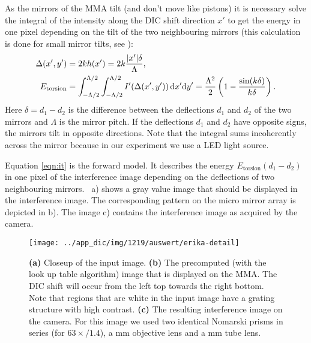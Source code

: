 As the mirrors of the MMA tilt (and don't move like pistons) it is
necessary solve the integral of the intensity along the DIC shift
direction $x'$ to get the energy in one pixel depending on the tilt of
the two neighbouring mirrors (this calculation is done for small
mirror tilts, see ):
\begin{align}
\label{eqn:it}
\Delta(x',y') &= 2kh(x') = 2k\frac{\mathopen| x' \mathclose| \delta}{\Lambda},\\
E_\textrm{torsion}&=\int_{-\Lambda/2}^{\Lambda/2}\int_{-\Lambda/2}^{\Lambda/2}
I'(\Delta(x',y'))\,
\textrm{d}x'\textrm{d}y'=\frac{\Lambda^2}{2}\left(1-\frac{\sin(k
    \delta)}{k \delta}\right).
\end{align}
Here $\delta=d_1-d_2$ is the difference between the deflections $d_1$
and $d_2$ of the two mirrors and $\Lambda$ is the mirror pitch. If the
deflections $d_1$ and $d_2$ have opposite signs, the mirrors tilt in
opposite directions. Note that the integral sums incoherently across
the mirror because in our experiment we use a LED light source.

Equation \ref{eqn:it} is the forward model. It describes the energy
$E_\textrm{torsion}(d_1-d_2)$ in one pixel of the interference image
depending on the deflections of two neighbouring
mirrors. ~a) shows a gray value image that
should be displayed in the interference image. The corresponding
pattern on the micro mirror array is depicted in b). The image c)
contains the interference image as acquired by the camera.

\begin{figure}[!htbp]
  \centering
  \texttt{[image: ../app\_dic/img/1219/auswert/erika-detail]}
  \caption{{\bf (a)} Closeup of the input image. {\bf (b)} The
    precomputed (with the look up table algorithm) image that is
    displayed on the MMA. The DIC shift will occur from the left top
    towards the right bottom. Note that regions that are white in the
    input image have a grating structure with high contrast. {\bf (c)}
    The resulting interference image on the camera. For this image we
    used two identical Nomarski prisms in series (for $63\times/1.4$), a
    \unit[100]{mm} objective lens and a \unit[300]{mm} tube lens.}
  \label{fig:erika-detail}
\end{figure}


